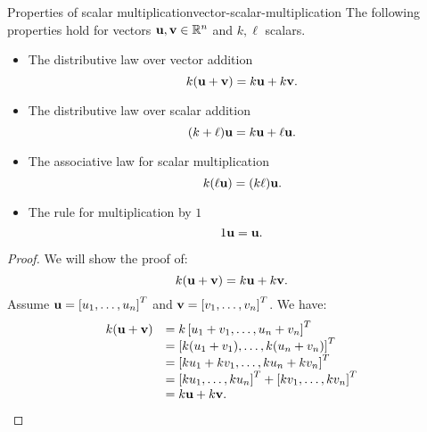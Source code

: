 \begin{theorem}{Properties of scalar multiplication}{vector-scalar-multiplication}
  The following properties hold for vectors
  $\vect{u},\vect{v}\in\R^n$ and $k,\ell$ scalars.%
  \begin{itemize}
  \item The distributive law over vector addition
    \begin{equation*}
      k(\vect{u} + \vect{v}) = k\vect{u} + k\vect{v}.
    \end{equation*}
  \item The distributive law over scalar addition
    \begin{equation*}
      (k + \ell) \vect{u} = k\vect{u} + \ell\vect{u}.
    \end{equation*}
  \item The associative law for scalar multiplication
    \begin{equation*}
      k(\ell\vect{u}) = (k\ell)\vect{u}.
    \end{equation*}
  \item The rule for multiplication by $1$
    \begin{equation*}
      1\vect{u}=\vect{u}.
    \end{equation*}
  \end{itemize}
\end{theorem}

\begin{proof}
  We will show the proof of:
  \begin{equation*}
    k(\vect{u} + \vect{v}) = k\vect{u} + k\vect{v}.
  \end{equation*}
  Assume $\vect{u}=\mat{u_1,\ldots,u_n}^T$ and
  $\vect{v}=\mat{v_1,\ldots,v_n}^T$. We have:
  \begin{equation*}
    \begin{array}{ll}
      k(\vect{u} + \vect{v}) & = k\mat{u_1 + v_1,\ldots,u_n + v_n}^T \\
                             & = \mat{k(u_1 + v_1), \ldots, k(u_n + v_n) }^T \\
                             & = \mat{ku_1 + k v_1, \ldots, ku_n + kv_n}^T \\
                             & = \mat{ku_1, \ldots, ku_n }^T + \mat{kv_1, \ldots, kv_n }^T \\
                             & = k\vect{u} + k\vect{v}.
    \end{array}
  \end{equation*}
\end{proof}

